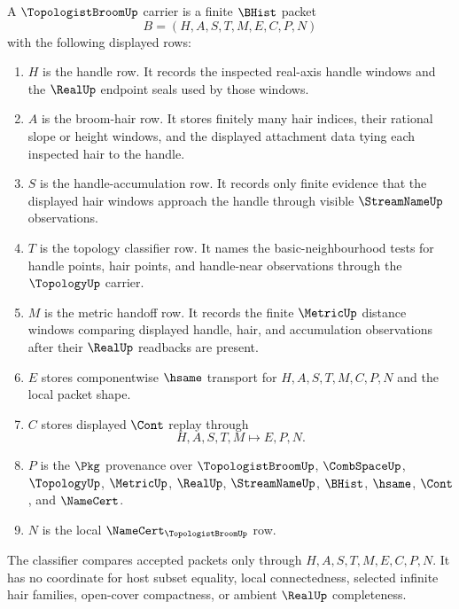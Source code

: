 \begin{definition}
\label{def:topologist-broom-carrier}
A $\TopologistBroomUp$ carrier is a finite $\BHist$ packet
$$
B=(H,A,S,T,M,E,C,P,N)
$$
with the following displayed rows:
\begin{enumerate}
\item $H$ is the handle row. It records the inspected real-axis handle windows and the $\RealUp$ endpoint seals used by those windows.
\item $A$ is the broom-hair row. It stores finitely many hair indices, their rational slope or height windows, and the displayed attachment data tying each inspected hair to the handle.
\item $S$ is the handle-accumulation row. It records only finite evidence that the displayed hair windows approach the handle through visible $\StreamNameUp$ observations.
\item $T$ is the topology classifier row. It names the basic-neighbourhood tests for handle points, hair points, and handle-near observations through the $\TopologyUp$ carrier.
\item $M$ is the metric handoff row. It records the finite $\MetricUp$ distance windows comparing displayed handle, hair, and accumulation observations after their $\RealUp$ readbacks are present.
\item $E$ stores componentwise $\hsame$ transport for $H,A,S,T,M,C,P,N$ and the local packet shape.
\item $C$ stores displayed $\Cont$ replay through
$$
H,A,S,T,M \longmapsto E,P,N .
$$
\item $P$ is the $\Pkg$ provenance over $\TopologistBroomUp$, $\CombSpaceUp$, $\TopologyUp$, $\MetricUp$, $\RealUp$, $\StreamNameUp$, $\BHist$, $\hsame$, $\Cont$, and $\NameCert$.
\item $N$ is the local $\NameCert_{\TopologistBroomUp}$ row.
\end{enumerate}
The classifier compares accepted packets only through $H,A,S,T,M,E,C,P,N$. It has no coordinate for host subset equality, local connectedness, selected infinite hair families, open-cover compactness, or ambient $\RealUp$ completeness.
\end{definition}

